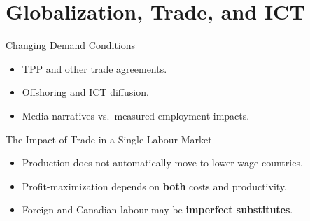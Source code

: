 \documentclass[aspectratio=169]{beamer}
\begin{document}
\section{Globalization, Trade, and ICT}

\begin{frame}{Changing Demand Conditions}
\transfade
\begin{itemize}[<+->]
  \item TPP and other trade agreements.
  \item Offshoring and ICT diffusion.
  \item Media narratives vs.\ measured employment impacts.
\end{itemize}
\end{frame}

\begin{frame}{The Impact of Trade in a Single Labour Market}
\transfade
\begin{itemize}[<+->]
  \item Production does not automatically move to lower-wage countries.
  \item Profit-maximization depends on \textbf{both} costs and productivity.
  \item Foreign and Canadian labour may be \textbf{imperfect substitutes}.
\end{itemize}
\end{frame}
\end{document}
